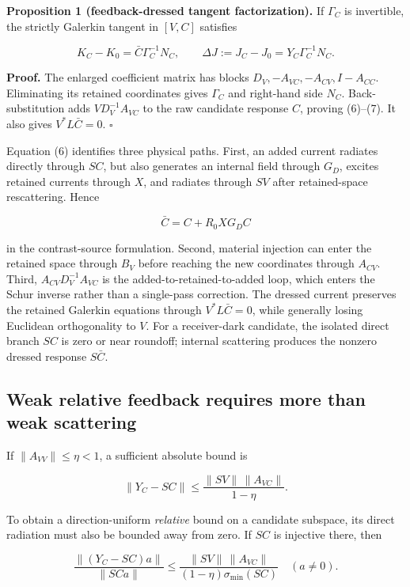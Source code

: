 \textbf{Proposition 1 (feedback-dressed tangent factorization).} If \(\Gamma_C\) is invertible, the strictly Galerkin tangent in \([V,C]\) satisfies

\[
K_C-K_0=\bar C\Gamma_C^{-1}N_C,\qquad
\Delta J:=J_C-J_0=Y_C\Gamma_C^{-1}N_C. \tag{7}
\]

\textbf{Proof.} The enlarged coefficient matrix has blocks \(D_V,-A_{VC},-A_{CV},I-A_{CC}\). Eliminating its retained coordinates gives \(\Gamma_C\) and right-hand side \(N_C\). Back-substitution adds \(VD_V^{-1}A_{VC}\) to the raw candidate response \(C\), proving (6)--(7). It also gives \(V^*L\bar C=0\). \hfill\(\square\)

Equation (6) identifies three physical paths. First, an added current radiates directly through \(SC\), but also generates an internal field through \(G_D\), excites retained currents through \(X\), and radiates through \(SV\) after retained-space rescattering. Hence

\[
\boxed{\bar C=C+R_0XG_DC}
\]

in the contrast-source formulation. Second, material injection can enter the retained space through \(B_V\) before reaching the new coordinates through \(A_{CV}\). Third, \(A_{CV}D_V^{-1}A_{VC}\) is the added-to-retained-to-added loop, which enters the Schur inverse rather than a single-pass correction. The dressed current preserves the retained Galerkin equations through \(V^*L\bar C=0\), while generally losing Euclidean orthogonality to \(V\). For a receiver-dark candidate, the isolated direct branch \(SC\) is zero or near roundoff; internal scattering produces the nonzero dressed response \(S\bar C\).



\subsection{Weak relative feedback requires more than weak scattering}

If \(\|A_{VV}\|\le\eta<1\), a sufficient absolute bound is

\[
\|Y_C-SC\|\le
\frac{\|SV\|\,\|A_{VC}\|}{1-\eta}. \tag{8}
\]

To obtain a direction-uniform \emph{relative} bound on a candidate subspace, its direct radiation must also be bounded away from zero. If \(SC\) is injective there, then

\[
\frac{\|(Y_C-SC)a\|}{\|SCa\|}
\le\frac{\|SV\|\,\|A_{VC}\|}
{(1-\eta)\sigma_{\min}(SC)}
\quad(a\ne0). \tag{9}
\]

